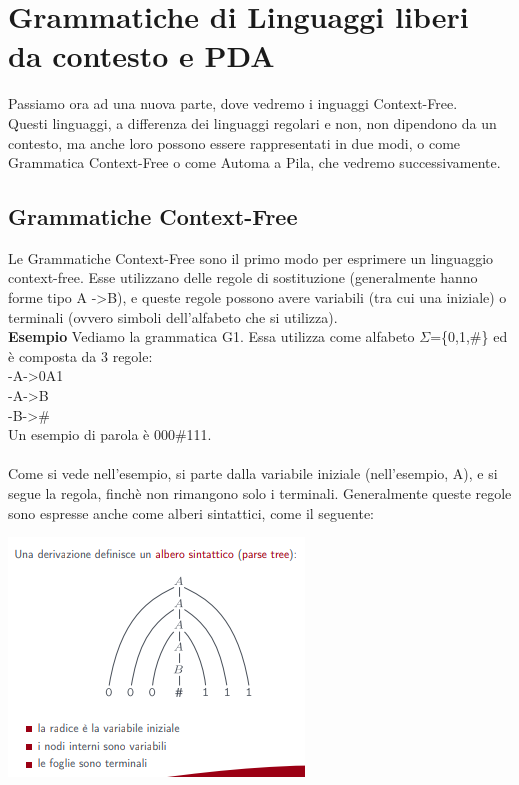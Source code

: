 \documentclass[]{article}
\begin{document}
	\section{Grammatiche di Linguaggi liberi da contesto e PDA}
		Passiamo ora ad una nuova parte, dove vedremo i inguaggi Context-Free.\\
		Questi linguaggi, a differenza dei linguaggi regolari e non, non  dipendono da un contesto, ma anche loro possono essere rappresentati in due modi, o come Grammatica Context-Free o come Automa a Pila, che vedremo successivamente.
		\subsection{Grammatiche Context-Free}
			Le Grammatiche Context-Free sono il primo modo per esprimere un linguaggio context-free. Esse utilizzano delle regole di sostituzione (generalmente hanno forme tipo A -\textgreater B), e queste regole possono avere variabili (tra cui una iniziale) o terminali (ovvero simboli dell'alfabeto che si utilizza).\\
			\textbf{Esempio} Vediamo la grammatica G1. Essa utilizza come alfabeto $\Sigma$=\{0,1,$\#$\} ed è composta da 3 regole:\\
			-A-\textgreater 0A1\\
			-A-\textgreater B\\
			-B-\textgreater $\#$\\
			Un esempio di parola è 000$\#$111.\\\\
			Come si vede nell'esempio, si parte dalla variabile iniziale (nell'esempio, A), e si segue la regola, finchè non rimangono solo i terminali. Generalmente queste regole sono espresse anche come alberi sintattici, come il seguente:
			\begin{center}
				\includegraphics{TREE.png}
			\end{center}
\end{document}
